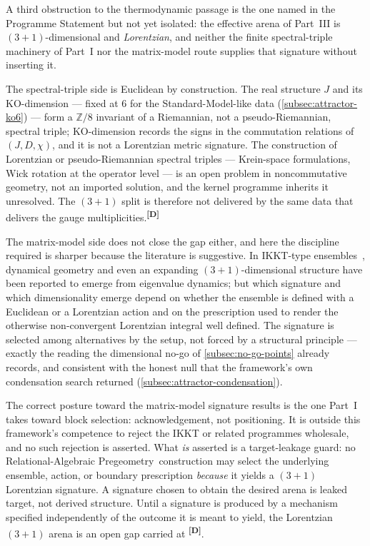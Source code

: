 \documentclass[12pt,a4paper,twoside]{article}
\theoremstyle{plain}
\theoremstyle{definition}
\theoremstyle{remark}
\newcommand{\ProjectShort}{Relational-Algebraic Pregeometry}
\newcommand{\RAP}{\ProjectShort}
\newcommand{\catmark}[1]{\textsuperscript{\textsf{\textbf{[#1]}}}}
\begin{document}
A third obstruction to the thermodynamic passage is the one named in the
Programme Statement but not yet isolated: the effective arena of Part~III
is $(3{+}1)$-dimensional and \emph{Lorentzian}, and neither the finite
spectral-triple machinery of Part~I nor the matrix-model route supplies
that signature without inserting it.

The spectral-triple side is Euclidean by construction. The real structure
$J$ and its $\mathrm{KO}$-dimension --- fixed at $6$ for the
Standard-Model-like data (\cref{subsec:attractor-ko6}) --- form a
$\mathbb Z/8$ invariant of a Riemannian, not a pseudo-Riemannian, spectral
triple; $\mathrm{KO}$-dimension records the signs in the commutation
relations of $(J, D, \chi)$, and it is not a Lorentzian metric signature.
The construction of Lorentzian or pseudo-Riemannian spectral triples ---
Krein-space formulations, Wick rotation at the operator level --- is an
open problem in noncommutative geometry, not an imported solution, and the
kernel programme inherits it unresolved. The $(3{+}1)$ split is therefore
not delivered by the same data that delivers the gauge
multiplicities.\catmark{D}

The matrix-model side does not close the gap either, and here the
discipline required is sharper because the literature is suggestive. In
IKKT-type ensembles~\cite{ikkt1997,steinacker2010}, dynamical geometry and
even an expanding $(3{+}1)$-dimensional structure have been reported to
emerge from eigenvalue dynamics; but which signature and which
dimensionality emerge depend on whether the ensemble is defined with a
Euclidean or a Lorentzian action and on the prescription used to render
the otherwise non-convergent Lorentzian integral well defined. The
signature is selected among alternatives by the setup, not forced by a
structural principle --- exactly the reading the dimensional no-go of
\cref{subsec:no-go-points} already records, and consistent with the honest
null that the framework's own condensation search returned
(\cref{subsec:attractor-condensation}).

\begin{governancebox}
The correct posture toward the matrix-model signature results is the one
Part~I takes toward block selection: acknowledgement, not positioning. It
is outside this framework's competence to reject the IKKT or related
programmes wholesale, and no such rejection is asserted. What \emph{is}
asserted is a target-leakage guard: no \RAP\ construction may select the
underlying ensemble, action, or boundary prescription \emph{because} it
yields a $(3{+}1)$ Lorentzian signature. A signature chosen to obtain the
desired arena is leaked target, not derived structure. Until a signature is
produced by a mechanism specified independently of the outcome it is meant
to yield, the Lorentzian $(3{+}1)$ arena is an open gap carried at
\catmark{D}.
\end{governancebox}
\end{document}

